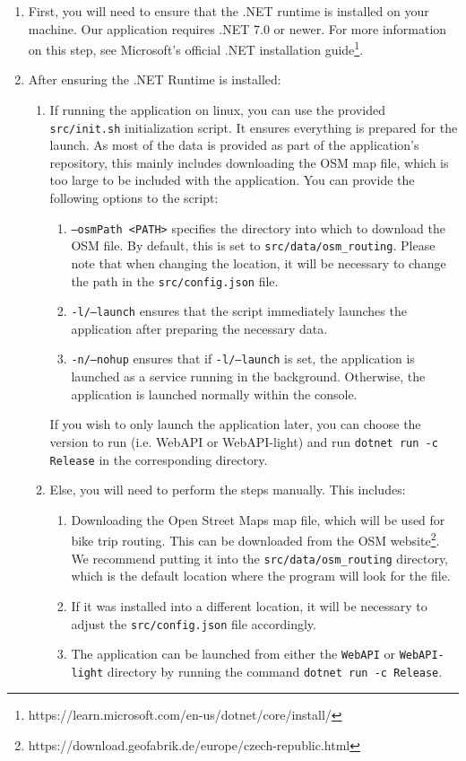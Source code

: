 \begin{enumerate}
    \item First, you will need to ensure that the .NET runtime is installed on your machine. Our application requires .NET 7.0 or newer. For more information on this step, see Microsoft's official .NET installation guide\footnote{https://learn.microsoft.com/en-us/dotnet/core/install/}.
    \item After ensuring the .NET Runtime is installed:
    \begin{enumerate}
        \item If running the application on linux, you can use the provided \texttt{src/init.sh} initialization script. It ensures everything is prepared for the launch. As most of the data is provided as part of the application's repository, this mainly includes downloading the OSM map file, which is too large to be included with the application. You can provide the following options to the script:
        \begin{enumerate}
            \item \texttt{--osmPath <PATH>} specifies the directory into which to download the OSM file. By default, this is set to \texttt{src/data/osm\_routing}. Please note that when changing the location, it will be necessary to change the path in the \texttt{src/config.json} file.
            \item \texttt{-l/--launch} ensures that the script immediately launches the application after preparing the necessary data.
            \item \texttt{-n/--nohup} ensures that if \texttt{-l/--launch} is set, the application is launched as a service running in the background. Otherwise, the application is launched normally within the console.
        \end{enumerate}
        If you wish to only launch the application later, you can choose the version to run (i.e. WebAPI or WebAPI-light) and run \texttt{dotnet run -c Release} in the corresponding directory.
        \item Else, you will need to perform the steps manually. This includes:
        \begin{enumerate}
            \item Downloading the Open Street Maps map file, which will be used for bike trip routing. This can be downloaded from the OSM website\footnote{https://download.geofabrik.de/europe/czech-republic.html}. We recommend putting it into the \texttt{src/data/osm\_routing} directory, which is the default location where the program will look for the file.
            \item If it was installed into a different location, it will be necessary to adjust the \texttt{src/config.json} file accordingly.
            \item The application can be launched from either the \texttt{WebAPI} or \texttt{WebAPI-light} directory by running the command \texttt{dotnet run -c Release}.
        \end{enumerate}
    \end{enumerate}
\end{enumerate}



